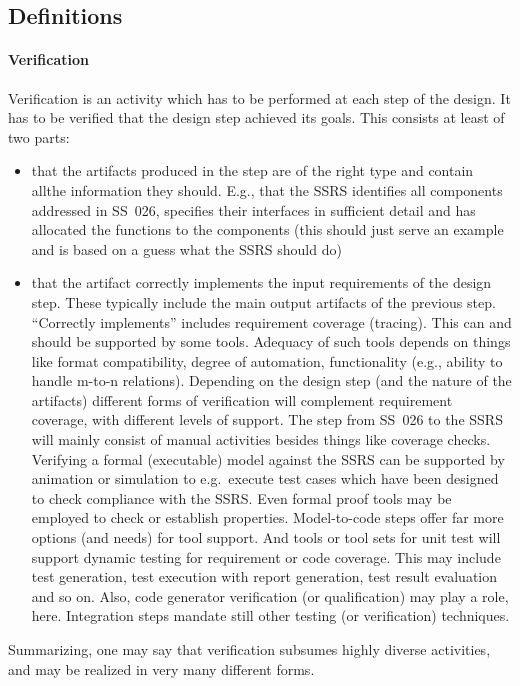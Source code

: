\documentclass{template/openetcs_article}
\begin{document}
\subsection{Definitions}

\paragraph{Verification}

Verification is an activity which has to be performed at each step of
the design. It has to be verified that the design step achieved its
goals. This consists at least of two parts:
\begin{itemize}
\item that the artifacts produced in the step are of the right type
  and contain allthe information they should. E.g., that the SSRS
  identifies all components addressed in SS~026, specifies their
  interfaces in sufficient detail and has allocated the functions to
  the components (this should just serve an example and is based on a
  guess what the SSRS should do)
\item that the artifact correctly implements the input requirements of
  the design step. These typically include the main output artifacts
  of the previous step. ``Correctly implements'' includes requirement
  coverage (tracing). This can and should be supported by some
  tools. Adequacy of such tools depends on things like format
  compatibility, degree of automation, functionality (e.g., ability to
  handle m-to-n relations). Depending on the design step (and the
  nature of the artifacts) different forms of verification will
  complement requirement coverage, with different levels of
  support. The step from SS~026 to the SSRS will mainly consist of
  manual activities besides things like coverage checks. Verifying a
  formal (executable) model against the SSRS can be supported by
  animation or simulation to e.g.\ execute test cases which have been
  designed to check compliance with the SSRS. Even formal proof tools
  may be employed to check or establish properties. Model-to-code steps
  offer far more options (and needs) for tool support. And tools or
  tool sets for unit test will support dynamic testing for requirement
  or code coverage. This may include test generation, test execution
  with report generation, test result evaluation and so on. Also, code
  generator verification (or qualification) may play a role,
  here. Integration steps mandate still other testing (or
  verification) techniques.
\end{itemize}
Summarizing, one may say that verification subsumes highly diverse
activities, and may be realized in very many different forms.
\end{document}
